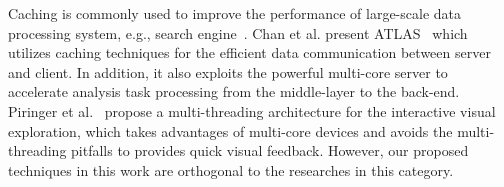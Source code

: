 Caching is commonly used to improve the performance of large-scale data processing system, e.g., search engine~\cite{xu2015diversified}.
Chan et al. present ATLAS~\cite{chan2008maintaining} which utilizes caching techniques for the efficient data communication between server and client.
In addition, it also exploits the powerful multi-core server to accelerate analysis task processing from the middle-layer to the back-end.
Piringer et al.~\cite{piringer2009multi} propose a multi-threading architecture for the interactive visual exploration,
which takes advantages of multi-core devices and avoids the multi-threading pitfalls to provides quick visual feedback.
However, our proposed techniques in this work are orthogonal to the researches in this category.



